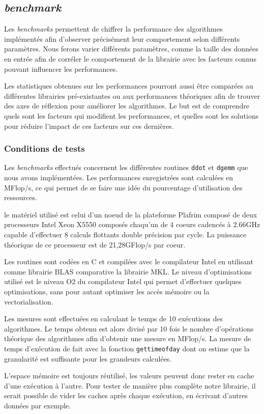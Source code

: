 \subsection{\emph{benchmark}}

Les \emph{benchmarks} permettent de chiffrer la performance des algorithmes implémentés afin d'observer précisément leur comportement selon différents paramètres. Nous ferons varier différents paramètres, comme la taille des données en entrée afin de corréler le comportement de la librairie avec les facteurs connus pouvant influencer les performances.

Les statistiques obtenues sur les performances pourront aussi être comparées au différentes librairies pré-existantes ou aux performances théoriques afin de trouver des axes de réflexion pour améliorer les algorithmes. Le but est de comprendre quels sont les facteurs qui modifient les performances, et quelles sont les solutions pour réduire l'impact de ces facteurs sur ces dernières.

\subsubsection{Conditions de tests}

Les \emph{benchmarks} effectués concernent les différentes routines \verb!ddot! et \verb!dgemm! que nous avons implémentées. Les performances enregistrées sont calculées en MFlop/s, ce qui permet de se faire une idée du pourcentage d'utilisation des ressources.

le matériel utilisé est celui d'un noeud de la plateforme \textsf{Plafrim} composé de deux processeurs Intel Xeon X5550 composés chaqu'un de 4 coeurs cadencés à 2.66GHz capable d'effectuer 8 calculs flottants double précision par cycle. La puissance théorique de ce processeur est de 21,28GFlop/s par coeur.

Les routines sont codées en C et compilées avec le compilateur Intel en utilisant comme librairie BLAS comparative la librairie MKL. Le niveau d'optimisations utilisé est le niveau O2 du compilateur Intel qui permet d'effectuer quelques optimisations, sans pour autant optimiser les accès mémoire ou la vectorialisation.

Les mesures sont effectuées en calculant le temps de 10 exécutions des algorithmes. Le temps obtenu est alors divisé par 10 fois le nombre d'opérations théorique des algorithmes afin d'obtenir une mesure en MFlop/s. La mesure de temps d'exécution de fait avec la fonction \texttt{gettimeofday} dont on estime que la granularité est suffisante pour les grandeurs calculées.

L'espace mémoire est toujours réutilisé, les valeurs peuvent donc rester en cache d'une exécution à l'autre. Pour tester de manière plus complète notre librairie, il serait possible de vider les caches après chaque exécution, en écrivant d'autres données par exemple.










